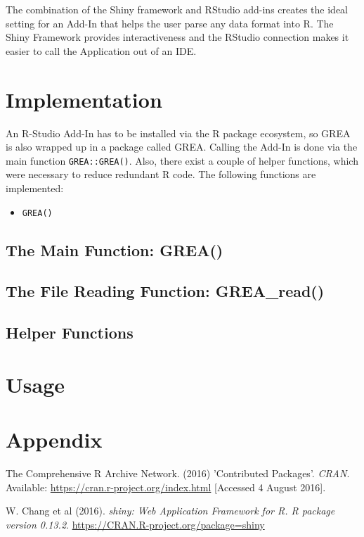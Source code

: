 \documentclass[12pt]{article} %
\newcommand{\li}{\lstinline}
\begin{document}
The combination of the Shiny framework and RStudio add-ins creates the ideal setting for an Add-In that helps the user parse any data format into R. The Shiny Framework provides interactiveness and the RStudio connection makes it easier to call the Application out of an IDE.

\section{Implementation}

An R-Studio Add-In has to be installed via the R package ecosystem, so GREA is also wrapped up in a package called GREA. Calling the Add-In is done via the main function \li{GREA::GREA()}. Also, there exist a couple of helper functions, which were necessary to reduce redundant R code.
The following functions are implemented:

\begin{itemize}
\item \li{GREA()}
\end{itemize}

\subsection{The Main Function: \textrm{GREA()}}
\subsection{The File Reading Function: \textrm{GREA\_read()}}
\subsection{Helper Functions}
\section{Usage}


\clearpage

\section*{Appendix}

\begin{thebibliography}{59}
\begin{singlespace}

The Comprehensive R Archive Network. (2016) 'Contributed Packages'. \emph{CRAN}.
Available: \url{https://cran.r-project.org/index.html} 
[Accessed 4 August 2016].

W. Chang et al (2016).
\emph{shiny: Web Application Framework for R. R package version 0.13.2}.
\url{https://CRAN.R-project.org/package=shiny}

\end{singlespace}
\end{thebibliography}
\end{document}
